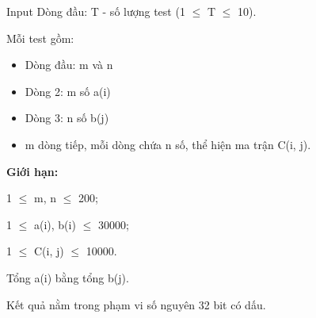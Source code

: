 Input
Dòng đầu: T - số lượng test (1  $\le$  T  $\le$  10).

Mỗi test gồm:
\begin{itemize}
	\item Dòng đầu: m và n
	\item Dòng 2: m số a(i)
	\item Dòng 3: n số b(j)
	\item m dòng tiếp, mỗi dòng chứa n số, thể hiện ma trận C(i, j).
\end{itemize}

\textbf{Giới hạn:}

1  $\le$  m, n  $\le$  200;

1  $\le$  a(i), b(i)  $\le$  30000;

1  $\le$  C(i, j)  $\le$  10000.

Tổng a(i) bằng tổng b(j).

Kết quả nằm trong phạm vi số nguyên 32 bit có dấu.